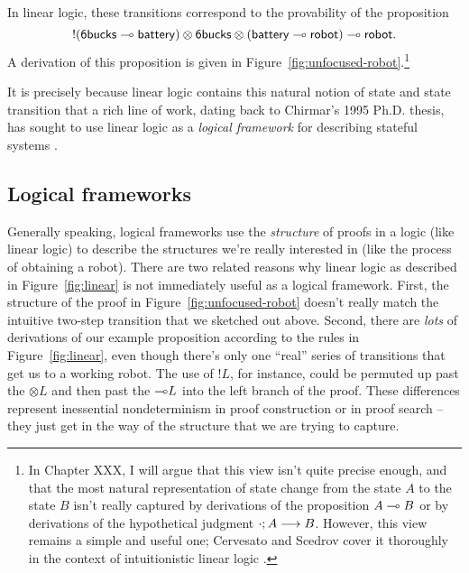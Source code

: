 In linear logic, these transitions correspond to the provability
of the proposition
\[{!}({\sf 6bucks} \multimap {\sf battery}) \otimes {\sf 6bucks} \otimes
({\sf battery} \multimap {\sf robot}) \multimap {\sf robot}.\] 
A derivation of this proposition is given in
Figure~\ref{fig:unfocused-robot}.\footnote{In Chapter XXX, I will
  argue that this view isn't quite precise enough, and that the most
  natural representation of state change from the state $A$ to the
  state $B$ isn't really captured by derivations of the proposition $A
  \multimap B$ or by derivations of the hypothetical judgment
  ${\cdot};{A} \longrightarrow {B} \mathstrut$.  However, this view remains a simple and useful
  one; Cervesato and Scedrov cover it thoroughly in the context of
  intuitionistic linear logic \cite{cervesato09relating}.}  



It is precisely because linear logic contains this natural notion of
state and state transition that a rich line of work, dating back to
Chirmar's 1995 Ph.D. thesis, has sought to use linear logic as a {\it
  logical framework} for describing stateful systems
\cite{chirimar95proof,cervesato02linear,
  cervesato02concurrent,pfenning04substructural,miller09formalizing,
  pfenning09substructural,cervesato09relating}.  

\subsection*{Logical frameworks}

Generally speaking, logical frameworks use the {\it structure} of
proofs in a logic (like linear logic) to describe the structures we're
really interested in (like the process of obtaining a robot).  There
are two related reasons why linear logic as described in
Figure~\ref{fig:linear} is not immediately useful as a logical
framework. First, the structure of the proof in
Figure~\ref{fig:unfocused-robot} doesn't really match the intuitive
two-step transition that we sketched out above. Second, there are {\it
  lots} of derivations of our example proposition according to the
rules in Figure~\ref{fig:linear}, even though there's only one
``real'' series of transitions that get us to a working robot. The use
of ${!}L$, for instance, could be permuted up past the ${\otimes}L$
and then past the ${\multimap}L$ into the left branch of the proof. These
differences represent inessential nondeterminism in proof construction
or in proof search -- they just get in the way of the structure that
we are trying to capture. 

